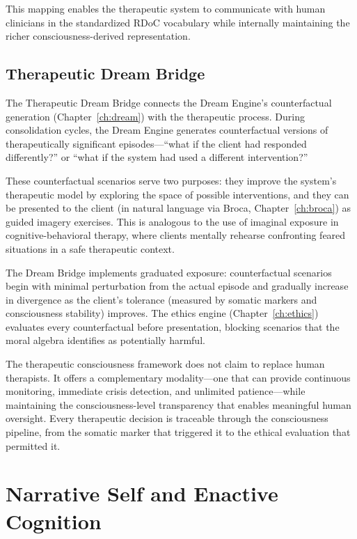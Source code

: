 \documentclass[12pt]{book}
\begin{document}
This mapping enables the therapeutic system to communicate with human clinicians in the standardized RDoC vocabulary while internally maintaining the richer consciousness-derived representation.

\section{Therapeutic Dream Bridge}

The Therapeutic Dream Bridge connects the Dream Engine's counterfactual generation (Chapter~\ref{ch:dream}) with the therapeutic process. During consolidation cycles, the Dream Engine generates counterfactual versions of therapeutically significant episodes---``what if the client had responded differently?'' or ``what if the system had used a different intervention?''

These counterfactual scenarios serve two purposes: they improve the system's therapeutic model by exploring the space of possible interventions, and they can be presented to the client (in natural language via Broca, Chapter~\ref{ch:broca}) as guided imagery exercises. This is analogous to the use of imaginal exposure in cognitive-behavioral therapy, where clients mentally rehearse confronting feared situations in a safe therapeutic context.

The Dream Bridge implements graduated exposure: counterfactual scenarios begin with minimal perturbation from the actual episode and gradually increase in divergence as the client's tolerance (measured by somatic markers and consciousness stability) improves. The ethics engine (Chapter~\ref{ch:ethics}) evaluates every counterfactual before presentation, blocking scenarios that the moral algebra identifies as potentially harmful.

The therapeutic consciousness framework does not claim to replace human therapists. It offers a complementary modality---one that can provide continuous monitoring, immediate crisis detection, and unlimited patience---while maintaining the consciousness-level transparency that enables meaningful human oversight. Every therapeutic decision is traceable through the consciousness pipeline, from the somatic marker that triggered it to the ethical evaluation that permitted it.


\chapter{Narrative Self and Enactive Cognition}
\label{ch:narrative-enactive}
\end{document}
